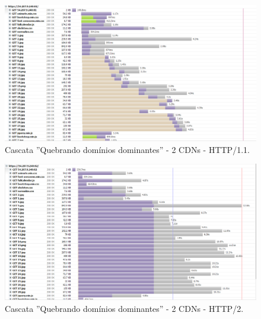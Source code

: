 \begin{apendicesenv}
\begin{landscape}
	\begin{figure}[!htb]
    	\centering
	    \caption{Cascata ''Quebrando domínios dominantes'' - 2 CDNs - HTTP/1.1.}
	    \includegraphics[width=1.5\textwidth]{./04-figuras/cascatas/2cds_http11}
	\end{figure}
\end{landscape}

\begin{landscape}
	\begin{figure}[!htb]
	    \centering
	    \caption{Cascata ''Quebrando domínios dominantes'' - 2 CDNs - HTTP/2.}
	    \includegraphics[width=1.5\textwidth]{./04-figuras/cascatas/2cds_http2}
	\end{figure}
\end{landscape}


\end{apendicesenv}
